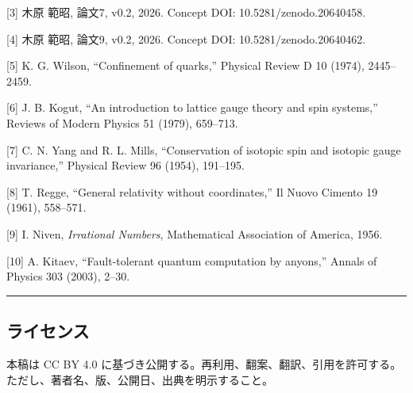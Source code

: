 \documentclass[
]{ltjsarticle}
\begin{document}
{[}3{]} 木原 範昭, 論文7, v0.2, 2026. Concept DOI: 10.5281/zenodo.20640458.

{[}4{]} 木原 範昭, 論文9, v0.2, 2026. Concept DOI: 10.5281/zenodo.20640462.

{[}5{]} K. G. Wilson, ``Confinement of quarks,'' Physical Review D 10
(1974), 2445--2459.

{[}6{]} J. B. Kogut, ``An introduction to lattice gauge theory and spin
systems,'' Reviews of Modern Physics 51 (1979), 659--713.

{[}7{]} C. N. Yang and R. L. Mills, ``Conservation of isotopic spin and
isotopic gauge invariance,'' Physical Review 96 (1954), 191--195.

{[}8{]} T. Regge, ``General relativity without coordinates,'' Il Nuovo
Cimento 19 (1961), 558--571.

{[}9{]} I. Niven, \emph{Irrational Numbers}, Mathematical Association of
America, 1956.

{[}10{]} A. Kitaev, ``Fault-tolerant quantum computation by anyons,''
Annals of Physics 303 (2003), 2--30.

\begin{center}\rule{0.5\linewidth}{0.5pt}\end{center}

\subsection{ライセンス}\label{ux30e9ux30a4ux30bbux30f3ux30b9}

本稿は CC BY 4.0
に基づき公開する。再利用、翻案、翻訳、引用を許可する。ただし、著者名、版、公開日、出典を明示すること。
\end{document}
